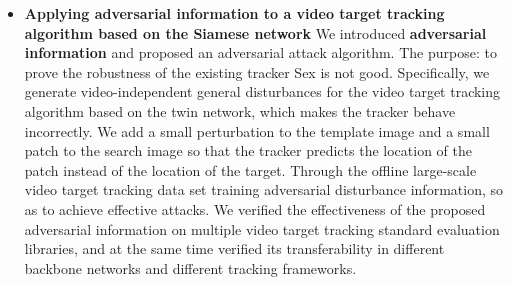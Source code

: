 \begin{itemize}
\item{\textbf{Applying adversarial information to a video target tracking algorithm based on the Siamese network} We introduced \textbf{adversarial information} and proposed an adversarial attack algorithm. The purpose: to prove the robustness of the existing tracker Sex is not good. Specifically, we generate video-independent general disturbances for the video target tracking algorithm based on the twin network, which makes the tracker behave incorrectly. We add a small perturbation to the template image and a small patch to the search image so that the tracker predicts the location of the patch instead of the location of the target. Through the offline large-scale video target tracking data set training adversarial disturbance information, so as to achieve effective attacks. We verified the effectiveness of the proposed adversarial information on multiple video target tracking standard evaluation libraries, and at the same time verified its transferability in different backbone networks and different tracking frameworks. }
\end{itemize}

